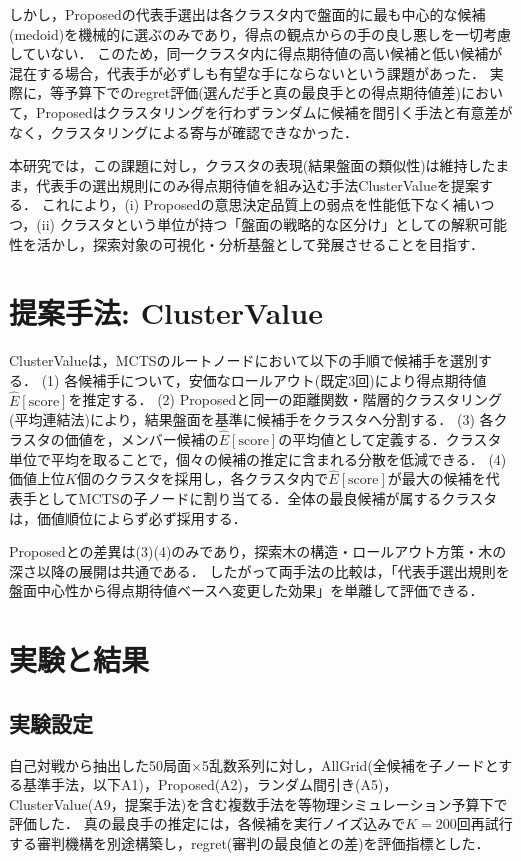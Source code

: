 \documentclass[submit,techrep,noauthor]{ipsj}
\begin{document}
しかし，Proposedの代表手選出は各クラスタ内で盤面的に最も中心的な候補(medoid)を機械的に選ぶのみであり，得点の観点からの手の良し悪しを一切考慮していない．
このため，同一クラスタ内に得点期待値の高い候補と低い候補が混在する場合，代表手が必ずしも有望な手にならないという課題があった．
実際に，等予算下でのregret評価(選んだ手と真の最良手との得点期待値差)において，Proposedはクラスタリングを行わずランダムに候補を間引く手法と有意差がなく，クラスタリングによる寄与が確認できなかった．

本研究では，この課題に対し，クラスタの表現(結果盤面の類似性)は維持したまま，代表手の選出規則にのみ得点期待値を組み込む手法ClusterValueを提案する．
これにより，(i) Proposedの意思決定品質上の弱点を性能低下なく補いつつ，(ii) クラスタという単位が持つ「盤面の戦略的な区分け」としての解釈可能性を活かし，探索対象の可視化・分析基盤として発展させることを目指す．

\section{提案手法: ClusterValue}

ClusterValueは，MCTSのルートノードにおいて以下の手順で候補手を選別する．
(1) 各候補手について，安価なロールアウト(既定3回)により得点期待値$\hat{E}[\mathrm{score}]$を推定する．
(2) Proposedと同一の距離関数・階層的クラスタリング(平均連結法)により，結果盤面を基準に候補手をクラスタへ分割する．
(3) 各クラスタの価値を，メンバー候補の$\hat{E}[\mathrm{score}]$の平均値として定義する．クラスタ単位で平均を取ることで，個々の候補の推定に含まれる分散を低減できる．
(4) 価値上位$K$個のクラスタを採用し，各クラスタ内で$\hat{E}[\mathrm{score}]$が最大の候補を代表手としてMCTSの子ノードに割り当てる．全体の最良候補が属するクラスタは，価値順位によらず必ず採用する．

Proposedとの差異は(3)(4)のみであり，探索木の構造・ロールアウト方策・木の深さ以降の展開は共通である．
したがって両手法の比較は，「代表手選出規則を盤面中心性から得点期待値ベースへ変更した効果」を単離して評価できる．

\section{実験と結果}

\subsection{実験設定}
自己対戦から抽出した50局面$\times$5乱数系列に対し，AllGrid(全候補を子ノードとする基準手法，以下A1)，Proposed(A2)，ランダム間引き(A5)，ClusterValue(A9，提案手法)を含む複数手法を等物理シミュレーション予算下で評価した．
真の最良手の推定には，各候補を実行ノイズ込みで$K{=}200$回再試行する審判機構を別途構築し，regret(審判の最良値との差)を評価指標とした．
\end{document}
